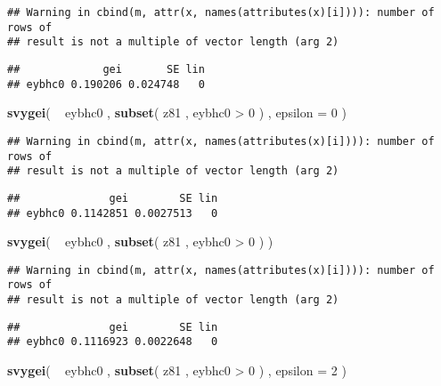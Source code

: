 \documentclass[]{book}
\newenvironment{Shaded}{\begin{snugshade}}{\end{snugshade}}
\newcommand{\KeywordTok}[1]{\textcolor[rgb]{0.13,0.29,0.53}{\textbf{{#1}}}}
\newcommand{\DataTypeTok}[1]{\textcolor[rgb]{0.13,0.29,0.53}{{#1}}}
\newcommand{\DecValTok}[1]{\textcolor[rgb]{0.00,0.00,0.81}{{#1}}}
\newcommand{\StringTok}[1]{\textcolor[rgb]{0.31,0.60,0.02}{{#1}}}
\newcommand{\NormalTok}[1]{{#1}}
\begin{document}
\begin{verbatim}
## Warning in cbind(m, attr(x, names(attributes(x)[i]))): number of rows of
## result is not a multiple of vector length (arg 2)
\end{verbatim}

\begin{verbatim}
##             gei       SE lin
## eybhc0 0.190206 0.024748   0
\end{verbatim}

\begin{Shaded}
\begin{Highlighting}[]
\KeywordTok{svygei}\NormalTok{( ~}\StringTok{ }\NormalTok{eybhc0 , }\KeywordTok{subset}\NormalTok{( z81 , eybhc0 >}\StringTok{ }\DecValTok{0} \NormalTok{) , }\DataTypeTok{epsilon =} \DecValTok{0} \NormalTok{)}
\end{Highlighting}
\end{Shaded}

\begin{verbatim}
## Warning in cbind(m, attr(x, names(attributes(x)[i]))): number of rows of
## result is not a multiple of vector length (arg 2)
\end{verbatim}

\begin{verbatim}
##              gei        SE lin
## eybhc0 0.1142851 0.0027513   0
\end{verbatim}

\begin{Shaded}
\begin{Highlighting}[]
\KeywordTok{svygei}\NormalTok{( ~}\StringTok{ }\NormalTok{eybhc0 , }\KeywordTok{subset}\NormalTok{( z81 , eybhc0 >}\StringTok{ }\DecValTok{0} \NormalTok{) )}
\end{Highlighting}
\end{Shaded}

\begin{verbatim}
## Warning in cbind(m, attr(x, names(attributes(x)[i]))): number of rows of
## result is not a multiple of vector length (arg 2)
\end{verbatim}

\begin{verbatim}
##              gei        SE lin
## eybhc0 0.1116923 0.0022648   0
\end{verbatim}

\begin{Shaded}
\begin{Highlighting}[]
\KeywordTok{svygei}\NormalTok{( ~}\StringTok{ }\NormalTok{eybhc0 , }\KeywordTok{subset}\NormalTok{( z81 , eybhc0 >}\StringTok{ }\DecValTok{0} \NormalTok{) , }\DataTypeTok{epsilon =} \DecValTok{2} \NormalTok{)}
\end{Highlighting}
\end{Shaded}
\end{document}
